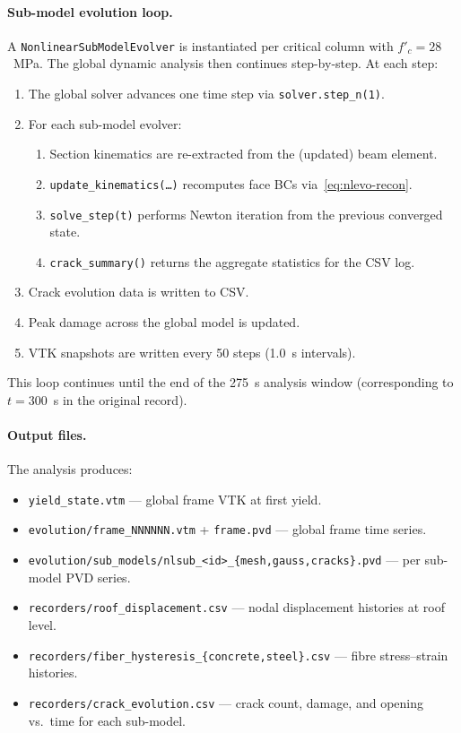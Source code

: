 \paragraph{Sub-model evolution loop.}
A \texttt{NonlinearSubModelEvolver} is instantiated per critical
column with $f'_c = 28$~MPa.  The global dynamic analysis then
continues step-by-step.  At each step:
\begin{enumerate}
  \item The global solver advances one time step via
        \texttt{solver.step\_n(1)}.
  \item For each sub-model evolver:
    \begin{enumerate}
      \item Section kinematics are re-extracted from the (updated)
            beam element.
      \item \texttt{update\_kinematics(\ldots)} recomputes face BCs
            via~\eqref{eq:nlevo-recon}.
      \item \texttt{solve\_step(t)} performs Newton iteration from
            the previous converged state.
      \item \texttt{crack\_summary()} returns the aggregate statistics
            for the CSV log.
    \end{enumerate}
  \item Crack evolution data is written to CSV.
  \item Peak damage across the global model is updated.
  \item VTK snapshots are written every 50 steps (1.0~s intervals).
\end{enumerate}

This loop continues until the end of the 275~s analysis window
(corresponding to $t = 300$~s in the original record).

\paragraph{Output files.}
The analysis produces:
\begin{itemize}
  \item \texttt{yield\_state.vtm} --- global frame VTK at first yield.
  \item \texttt{evolution/frame\_NNNNNN.vtm} + \texttt{frame.pvd} ---
        global frame time series.
  \item \texttt{evolution/sub\_models/nlsub\_<id>\_\{mesh,gauss,cracks\}.pvd} ---
        per sub-model PVD series.
  \item \texttt{recorders/roof\_displacement.csv} --- nodal displacement
        histories at roof level.
  \item \texttt{recorders/fiber\_hysteresis\_\{concrete,steel\}.csv} ---
        fibre stress--strain histories.
  \item \texttt{recorders/crack\_evolution.csv} --- crack count, damage,
        and opening vs.\ time for each sub-model.
\end{itemize}



